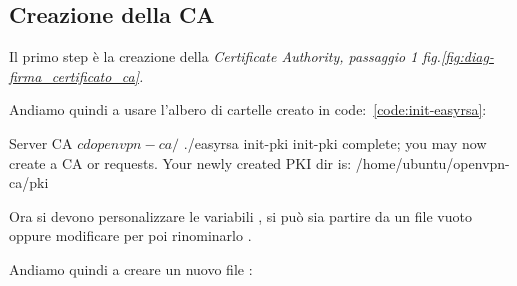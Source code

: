 \subsection{Creazione della CA} %

Il primo step è la creazione della \it{Certificate Authority}, passaggio 1 fig.\ref{fig:diag-firma_certificato_ca}. 

Andiamo quindi a usare l'albero di cartelle creato in code:~\ref{code:init-easyrsa}:

\begin{bashcode}{Server CA}{}
$ cd openvpn-ca/
$ ./easyrsa init-pki
init-pki complete; you may now create a CA or requests.
Your newly created PKI dir is: /home/ubuntu/openvpn-ca/pki
\end{bashcode}

Ora si devono personalizzare le variabili , si può sia partire da un file vuoto oppure modificare  per poi rinominarlo .

Andiamo quindi a creare un nuovo file :


